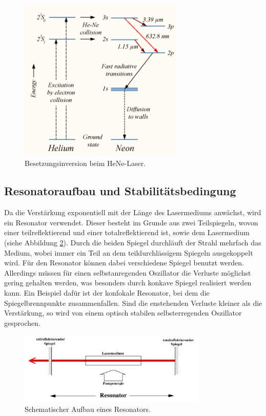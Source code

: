 \begin{figure}
  \centering
  \includegraphics[width = 0.7\textwidth]{Pics/Niveaus.png}
  \caption{Besetzungsinversion beim HeNe-Laser. \cite{Inversion}}
  \label{fig:Inversion}
\end{figure}


\subsection{Resonatoraufbau und Stabilitätsbedingung}
\label{sub:ResStab}

Da die Verstärkung exponentiell mit der Länge des Lasermediums anwächst, wird
ein Resonator verwendet. Dieser besteht im Grunde aus zwei Teilspiegeln,
wovon einer teilreflektierend und einer totalreflektierend ist, sowie dem Lasermedium
(siehe Abbildung \ref{fig:Resonator}). Durch die beiden Spiegel durchläuft der Strahl
mehrfach das Medium, wobei immer ein Teil an dem teildurchlässigem Spiegeln
ausgekoppelt wird. Für den Resonator können dabei verschiedene Spiegel benutzt werden.
Allerdings müssen für einen selbstanregenden Oszillator die Verluste möglichst gering
gehalten werden, was besonders durch konkave Spiegel realisiert werden kann.
Ein Beispiel dafür ist der konfokale Resonator, bei dem die Spiegelbrennpunkte zusammenfallen.
Sind die enstehenden Verluste kleiner als die Verstärkung, so wird von einem
optisch stabilen selbsterregenden Oszillator gesprochen.

\begin{figure}
  \centering
  \includegraphics[width = 0.8\textwidth]{Pics/Resonator.png}
  \caption{Schematischer Aufbau eines Resonators. \cite{anleitung}}
  \label{fig:Resonator}
\end{figure}

